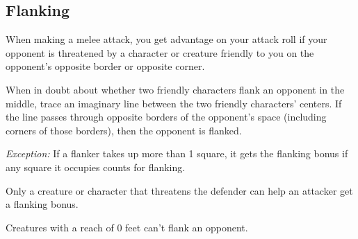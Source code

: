 \subsection{Flanking}
When making a melee attack, you get advantage on your attack roll if your opponent is threatened by a character or creature friendly to you on the opponent's opposite border or opposite corner.

When in doubt about whether two friendly characters flank an opponent in the middle, trace an imaginary line between the two friendly characters' centers. If the line passes through opposite borders of the opponent's space (including corners of those borders), then the opponent is flanked.

\textit{Exception:} If a flanker takes up more than 1 square, it gets the flanking bonus if any square it occupies counts for flanking.

Only a creature or character that threatens the defender can help an attacker get a flanking bonus.

Creatures with a reach of 0 feet can't flank an opponent.